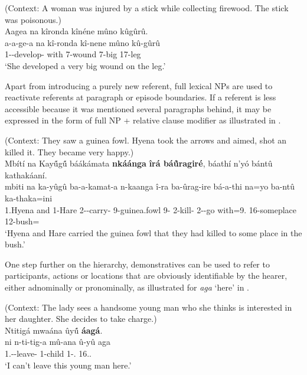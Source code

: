 \documentclass[output=paper]{langscibook}
\begin{document}
\z
\ea
\label{bkm:Ref120115709}
(Context: A woman was injured by a stick while collecting firewood. The stick was poisonous.)\\
Aagea na kîronda kînéne mûno kûgûrû.\\
\gll
a-a-ge-a  na  kî-ronda  kî-nene  mûno  kû-gûrû\\
1\SM-\PST{}-develop-\FV{} with  7-wound  7-big \INT{} 17-leg\\
\glt
‘She developed a very big wound on the leg.’

\z


Apart from introducing a purely new referent, full lexical NPs are used to reactivate referents at paragraph or episode boundaries. If a referent is less accessible because it was mentioned several paragraphs behind, it may be expressed in the form of full NP + relative clause modifier as illustrated in .

\ea
\label{bkm:Ref120116164}
(Context: They saw a guinea fowl. Hyena took the arrows and aimed, shot an killed it. They became very happy.)\\
Mbítí na Kay\'{û}g\'{û} báákámata \textbf{nkáánga} \textbf{îrá bá\'{û}ragiré}, báathí n’yó bántû kathakáaní.\\
\gll
mbiti  na  ka-yûgû  ba-a-kamat-a n-kaanga  î-ra  ba-ûrag-ire bá-a-thi  na=yo  ba-ntû  ka-thaka=ini \\
1.Hyena  and  1-Hare  2\SM{}-\PST{}-carry-\FV{} 9-guinea.fowl  9-\RM{} 2\SM{}-kill-\PFV{} 2\SM-\PST{}-go  with=9.\PRO{} {\db}16-someplace  12-bush=\LOC{} \\
\glt
‘Hyena and Hare carried the guinea fowl that they had killed to some place in the bush.’

\z

One step further on the hierarchy, demonstratives can be used to refer to participants, actions or locations that are obviously identifiable by the hearer, either adnominally or pronominally, as illustrated for \textit{aga} ‘here’ in .

\ea
\label{bkm:Ref116888088}
(Context: The lady sees a handsome young man who she thinks is interested in her daughter. She decides to take charge.)\\
Ntitigá mwaána ûy\'{û} \textbf{áagá}.\\
\gll
ni  n-ti-tig-a  mû-ana  û-yû aga\\
\FOC{}  1\SG.\SM-\NEG{}-leave-\FV{} 1-child  1-\DEM.\PROX{} 16.\DEM.\PROX{}\\
\glt
‘I can’t leave this young man here.’
\end{document}
